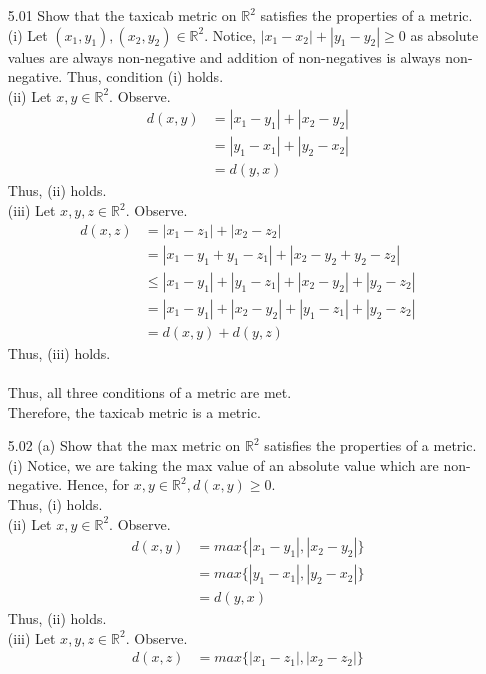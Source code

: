 \documentclass[12pt]{article}
\newcommand{\R}{\mathbb{R}}
\newcommand{\1}{^{-1}}
\begin{document}
	\begin{enumerate}
		
		\item[5.01] Show that the taxicab metric on $\mathbb{R}^{2}$ satisfies the properties of a metric.\\
		(i) Let $ (x_1,y_1),(x_2,y_2)\in \R^2 $. Notice, $ |x_1-x_2| + |y_1 - y_2| \geq 0$ as absolute values are always non-negative and addition of non-negatives is always non-negative.
		Thus, condition (i) holds.\\
		(ii) Let $ x,y\in \R^2 $. Observe.
		\begin{align*}
		d(x,y) &= |x_1-y_1|+|x_2-y_2|\\
		&= |y_1-x_1|+|y_2-x_2|\\
		&= d(y,x)
		\end{align*}
		Thus, (ii) holds.\\
		(iii) Let $ x,y,z \in \R^2 $. Observe.
		\begin{align*}
		d(x,z) &= |x_1-z_1|+|x_2-z_2|\\
		&= |x_1-y_1+y_1-z_1|+|x_2-y_2+y_2-z_2|\\
		&\leq |x_1-y_1|+|y_1-z_1|+|x_2-y_2|+|y_2-z_2|\\
		&=    |x_1-y_1|+|x_2-y_2|+|y_1-z_1|+|y_2-z_2|\\
		&= d(x,y)+d(y,z)
		\end{align*}
		Thus, (iii) holds.\\
		\\
		Thus, all three conditions of a metric are met.\\
		Therefore, the taxicab metric is a metric.
		\item[5.02] (a) Show that the max metric on $\mathbb{R}^{2}$ satisfies the properties of a metric.\\
		(i) Notice, we are taking the max value of an absolute value which are non-negative. Hence, for $ x,y\in \R^2 , d(x,y)\geq 0$. \\ 
		Thus, (i) holds.\\
		(ii) Let $ x,y\in \R^2 $. Observe.
		\begin{align*}
		d(x,y) &= max\{|x_1-y_1|,|x_2-y_2|\}\\
		&= max\{|y_1-x_1|,|y_2-x_2|\}\\
		&= d(y,x)
		\end{align*}
		Thus, (ii) holds.\\
		(iii) Let $ x,y,z \in \R^2 $. Observe.
		\begin{align*}
		d(x,z)  &= max\{|x_1-z_1|,|x_2-z_2|\}\\

\end{align*}
\end{enumerate}
\end{document}
